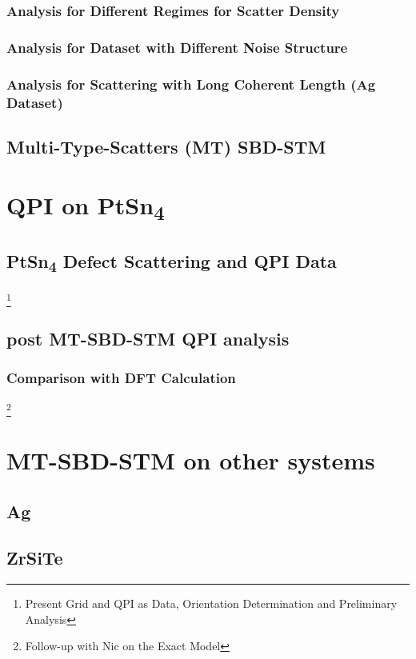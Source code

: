 \subsection{Analysis for Different Regimes for Scatter Density}
\subsection{Analysis for Dataset with Different Noise Structure}
\subsection{Analysis for Scattering with Long Coherent Length (Ag Dataset)}
\section{Multi-Type-Scatters (MT) SBD-STM}

\chapter{QPI on PtSn\textsubscript{4}}
\section{PtSn\textsubscript{4} Defect Scattering and QPI Data}
\footnote{Present Grid and QPI as Data, Orientation Determination and Preliminary Analysis}
\section{post MT-SBD-STM QPI analysis}
\subsection{Comparison with DFT Calculation}
\footnote{Follow-up with Nic on the Exact Model}

\chapter{MT-SBD-STM on other systems}
\section{Ag}
\section{ZrSiTe}